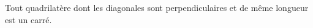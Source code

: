 Tout quadrilatère dont les diagonales sont perpendiculaires et de même longueur est un carré.

\begin{reponses}
\end{reponses}

\begin{comment}
Non: un tel quadrilatère est appelé un 'pseudo-carré'.
\end{comment}

